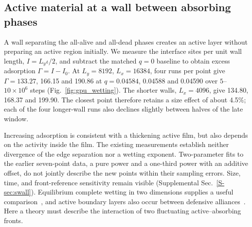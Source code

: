 \subsection{Active material at a wall between absorbing phases}
\label{sec:wall}

A wall separating the all-alive and all-dead phases creates an active
layer without preparing an active region initially. We measure the
interface sites per unit wall length, $I=L_y\iota/2$, and subtract the
matched $q=0$ baseline to obtain excess adsorption $\Gamma=I-I_0$.
At $L_y=8192$, $L_x=16384$, four runs per point give
$\Gamma=133.27$, 166.15 and 190.86 at $q=0.04584$, 0.04588 and
0.04590 over $5$--$10\times10^6$ steps
(Fig.~\ref{fig:gpu_wetting}). The shorter walls, $L_x=4096$, give
134.80, 168.37 and 199.90. The closest point therefore retains a size
effect of about 4.5\%; each of the four longer-wall runs also declines
slightly between halves of the late window.



Increasing adsorption is consistent with a thickening active film, but
also depends on the activity inside the film. The existing measurements
establish neither divergence of the edge separation nor a wetting
exponent. Two-parameter fits to the earlier seven-point data, a pure
power and a one-third power with an additive offset, do not jointly
describe the new points within their sampling errors. Size, time,
and front-reference sensitivity remain visible
(Supplemental Sec.~\ref{S-sec:swall}).
Equilibrium complete wetting in two dimensions supplies a useful
comparison~\cite{lipowsky1983,fisher1984,carlon1999}, and active boundary
layers also occur between defensive alliances~\cite{szabo2007}.
Here a theory must describe the interaction of two fluctuating
active--absorbing fronts.

